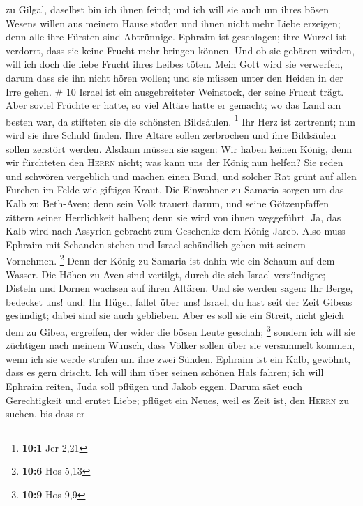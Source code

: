 zu Gilgal, daselbst bin ich ihnen feind; und ich will sie auch um ihres
bösen Wesens willen aus meinem Hause stoßen und ihnen nicht mehr Liebe
erzeigen; denn alle ihre Fürsten sind Abtrünnige. 
Ephraim ist geschlagen; ihre Wurzel ist verdorrt, dass sie keine Frucht
mehr bringen können. Und ob sie gebären würden, will ich doch die liebe
Frucht ihres Leibes töten.  Mein Gott wird sie verwerfen,
darum dass sie ihn nicht hören wollen; und sie müssen unter den Heiden
in der Irre gehen. \# 10  Israel ist ein ausgebreiteter
Weinstock, der seine Frucht trägt. Aber soviel Früchte er hatte, so viel
Altäre hatte er gemacht; wo das Land am besten war, da stifteten sie die
schönsten Bildsäulen. \footnote{\textbf{10:1} Jer 2,21} 
Ihr Herz ist zertrennt; nun wird sie ihre Schuld finden. Ihre Altäre
sollen zerbrochen und ihre Bildsäulen sollen zerstört werden.
 Alsdann müssen sie sagen: Wir haben keinen König, denn
wir fürchteten den \textsc{Herrn} nicht; was kann uns der König nun
helfen?  Sie reden und schwören vergeblich und machen
einen Bund, und solcher Rat grünt auf allen Furchen im Felde wie
giftiges Kraut.  Die Einwohner zu Samaria sorgen um das
Kalb zu Beth-Aven; denn sein Volk trauert darum, und seine Götzenpfaffen
zittern seiner Herrlichkeit halben; denn sie wird von ihnen weggeführt.
 Ja, das Kalb wird nach Assyrien gebracht zum Geschenke
dem König Jareb. Also muss Ephraim mit Schanden stehen und Israel
schändlich gehen mit seinem Vornehmen. \footnote{\textbf{10:6} Hos 5,13}
 Denn der König zu Samaria ist dahin wie ein Schaum auf
dem Wasser.  Die Höhen zu Aven sind vertilgt, durch die
sich Israel versündigte; Disteln und Dornen wachsen auf ihren Altären.
Und sie werden sagen: Ihr Berge, bedecket uns! und: Ihr Hügel, fallet
über uns!  Israel, du hast seit der Zeit Gibeas gesündigt;
dabei sind sie auch geblieben. Aber es soll sie ein Streit, nicht gleich
dem zu Gibea, ergreifen, der wider die bösen Leute geschah; \footnote{\textbf{10:9}
  Hos 9,9}  sondern ich will sie züchtigen nach meinem
Wunsch, dass Völker sollen über sie versammelt kommen, wenn ich sie
werde strafen um ihre zwei Sünden.  Ephraim ist ein Kalb,
gewöhnt, dass es gern drischt. Ich will ihm über seinen schönen Hals
fahren; ich will Ephraim reiten, Juda soll pflügen und Jakob eggen.
 Darum säet euch Gerechtigkeit und erntet Liebe; pflüget
ein Neues, weil es Zeit ist, den \textsc{Herrn} zu suchen, bis dass er
